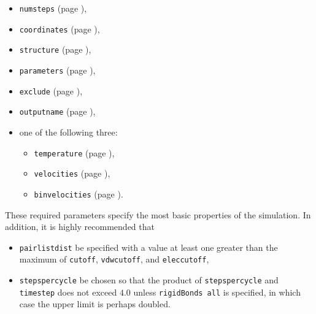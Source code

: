 \begin{itemize}

\item
{\tt numsteps} (page \pageref{param:numsteps}),

\item
{\tt coordinates} (page \pageref{param:coordinates}),

\item
{\tt structure} (page \pageref{param:structure}),

\item
{\tt parameters} (page \pageref{param:parameters}),

\item
{\tt exclude} (page \pageref{param:exclude}), 

\item
{\tt outputname} (page \pageref{param:outputname}), 

\item
one of the following three:
\begin{itemize}
\item
{\tt temperature} (page \pageref{param:temperature}),

\item
{\tt velocities} (page \pageref{param:velocities}),

\item
{\tt binvelocities} (page \pageref{param:binvelocities}).
\end{itemize}

\end{itemize}

\noindent These required parameters specify the most basic properties of
the simulation.  %
In addition, it is highly recommended that 
\begin{itemize}
\item
{\tt pairlistdist} be specified with a 
value at least one greater than the maximum of 
{\tt cutoff}, {\tt vdwcutoff}, and {\tt eleccutoff}, 
\item 
{\tt stepspercycle} be chosen so that the product of 
{\tt stepspercycle} and {\tt timestep} does not exceed 
$4.0$ unless {\tt rigidBonds all} is specified, 
in which case the upper limit is perhaps doubled.  
\end{itemize}

